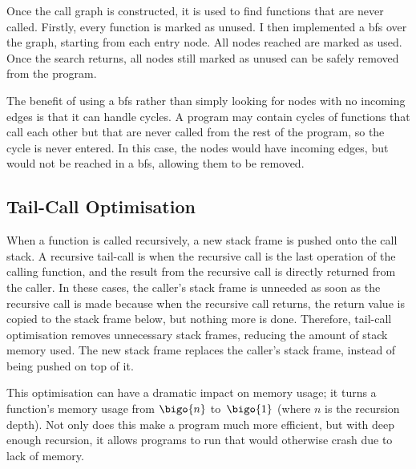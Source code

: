 \documentclass[00-main.tex]{subfiles}
\begin{document}


Once the call graph is constructed, it is used to find functions that are never called.
Firstly, every function is marked as unused.
I then implemented a \gls{bfs} over the graph, starting from each entry node.
All nodes reached are marked as used.
Once the search returns, all nodes still marked as unused can be safely removed from the program.

The benefit of using a \gls{bfs} rather than simply looking for nodes with no incoming edges is that it can handle cycles.
A program may contain cycles of functions that call each other but that are never called from the rest of the program, so the cycle is never entered.
In this case, the nodes would have incoming edges, but would not be reached in a \gls{bfs}, allowing them to be removed.


\subsection{Tail-Call Optimisation}\label{sec:impl:tail-call optimisation}

When a function is called recursively, a new stack frame is pushed onto the call stack.
A recursive tail-call is when the recursive call is the last operation of the calling function, and the result from the recursive call is directly returned from the caller.
In these cases, the caller's stack frame is unneeded as soon as the recursive call is made because when the recursive call returns, the return value is copied to the stack frame below, but nothing more is done.
Therefore, tail-call optimisation removes unnecessary stack frames, reducing the amount of stack memory used.
The new stack frame replaces the caller's stack frame, instead of being pushed on top of it.

This optimisation can have a dramatic impact on memory usage; it turns a function's memory usage from $\bigo{n}$ to~$\bigo{1}$ (where $n$ is the recursion depth).
Not only does this make a program much more efficient, but with deep enough recursion, it allows programs to run that would otherwise crash due to lack of memory.
\end{document}
